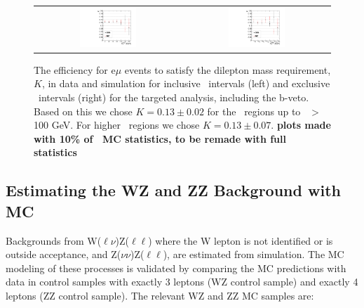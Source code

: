 \begin{figure}[!hb]
\begin{center}
\begin{tabular}{cc}
\includegraphics[width=0.4\textwidth]{plots/extractK_inclusive_bveto.pdf} &
\includegraphics[width=0.4\textwidth]{plots/extractK_exclusive_bveto.pdf} \\
\end{tabular}
\caption{
The efficiency for e$\mu$ events to satisfy the dilepton mass requirement, $K$, in data and simulation for inclusive \MET\ intervals (left) and
exclusive \MET\ intervals (right) for the targeted analysis, including the b-veto. 
Based on this we chose $K=0.13\pm0.02$ for the \MET\ regions up to \MET\ $>$ 100 GeV.
For higher \MET\ regions we chose $K=0.13\pm0.07$.
{\bf plots made with 10\% of \zjets\ MC statistics, to be remade with full statistics}
\label{fig:K_targeted}
}
\end{center}
\end{figure}

\clearpage

\subsection{Estimating the WZ and ZZ Background with MC}
\label{sec:bkg_vz}

Backgrounds from W($\ell\nu$)Z($\ell\ell$) where the W lepton is not identified or is outside acceptance, and Z($\nu\nu$)Z($\ell\ell$),
are estimated from simulation. The MC modeling of these processes is validated by comparing the MC predictions with data in control samples
with exactly 3 leptons (WZ control sample) and exactly 4 leptons (ZZ control sample). 
The relevant WZ and ZZ MC samples are:

